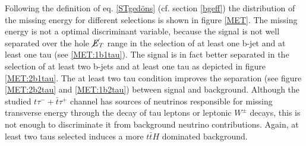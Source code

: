 %
Following the definition of eq. \ref{STgedöns} (cf. section \ref{bgeff}) the distribution of the missing energy for different selections is shown in figure \ref{MET}. The missing energy is not a optimal discriminant variable, because the signal is not well separated over the hole $\cancel{E}_T$ range in the selection of at least one b-jet and at least one tau (see \ref{MET:1b1tau}). The signal is in fact better separated in the selection of at least two b-jets and at least one tau as depicted in figure \ref{MET:2b1tau}. The at least two tau condition improves the separation (see figure \ref{MET:2b2tau} and \ref{MET:1b2tau}) between signal and background. Although the studied $t\tau^{-}+\bar{t}\tau^{+}$ channel has sources of neutrinos responsible for missing transverse energy through the decay of tau leptons or leptonic $W^\pm$ decays, this is not enough to discriminate it from background neutrino contributions. Again, at least two taus selected induces a more $t\bar{t}H$ dominated background. \par   
%
